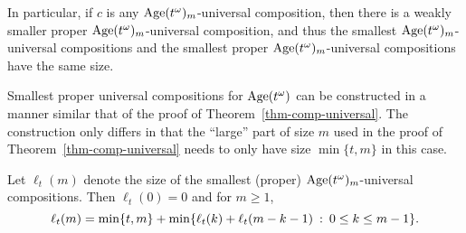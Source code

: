 In particular, if $c$ is any $\operatorname{Age}(t^\omega)_m$-universal composition, then there is a weakly smaller proper $\operatorname{Age}(t^\omega)_m$-universal composition, and thus the smallest $\operatorname{Age}(t^\omega)_m$-universal compositions and the smallest proper $\operatorname{Age}(t^\omega)_m$-universal compositions have the same size.

Smallest proper universal compositions for $\operatorname{Age}(t^\omega)$ can be constructed in a manner similar that of the proof of Theorem~\ref{thm-comp-universal}. The construction only differs in that the ``large'' part of size $m$ used in the proof of Theorem~\ref{thm-comp-universal} needs to only have size $\min\{t, m\}$ in this case.
\begin{theorem}
\label{thm-comp-bdd-part-size}
	Let $\ell_t(m)$ denote the size of the smallest (proper) $\operatorname{Age}(t^\omega)_m$-universal compositions. Then $\ell_t(0) = 0$ and for $m \ge 1$,
	\[
		\ell_t(m)
		=
		\min\{t,m\} + \min\{\ell_t(k) + \ell_t(m-k-1) \::\: 0 \le k \le m-1\}.
	\]
\end{theorem}
